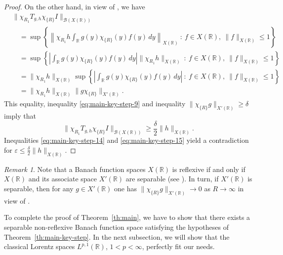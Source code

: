 \documentclass[reqno]{amsproc}
\newcommand{\cB}{\mathcal{B}}
\newcommand{\eps}{\varepsilon}
\newcommand{\R}{\mathbb{R}}
\theoremstyle{definition}
\theoremstyle{remark}
\newtheorem{remark}[theorem]{Remark}
\numberwithin{equation}{section}
\begin{document}
\begin{proof}
On the other hand, in view of \cite[Chap.~1, Lemma~2.8]{BS88},
we have
\begin{align*}
&
\|\chi_{R_1} T_{g,h}\chi_{\{R\}}I\|_{\cB(X(\R))}
\\
&\quad=
\sup\left\{
\left\|\chi_{R_1}h\int_\R g(y)\chi_{\{R\}}(y)f(y)\,dy\right\|_{X(\R)}
\ :\
f\in X(\R),\ \|f\|_{X(\R)}\le 1
\right\}
\\
&\quad=
\sup\left\{
\left|\int_\R g(y)\chi_{\{R\}}(y)f(y)\,dy\right|
\|\chi_{R_1}h\|_{X(\R)}
\ :\
f\in X(\R),\ \|f\|_{X(\R)}\le 1
\right\}
\\
&\quad=\|\chi_{R_1}h\|_{X(\R)}
\sup\left\{
\left|\int_\R g(y)\chi_{\{R\}}(y)f(y)\,dy\right|
\ :\
f\in X(\R),\ \|f\|_{X(\R)}\le 1
\right\}
\\
&\quad=
\|\chi_{R_1}h\|_{X(\R)}\|g\chi_{\{R\}}\|_{X'(\R)}.
\end{align*}
This equality, inequality \eqref{eq:main-key-step-9} and inequality
$\|\chi_{\{R\}}g\|_{X'(\R)}\ge\delta$ imply that
\begin{equation}\label{eq:main-key-step-15}
\|\chi_{R_1}T_{g,h}\chi_{\{R\}}I\|_{\cB(X(\R))}
\ge\frac{\delta}{2}\|h\|_{X(\R)}.
\end{equation}
Inequalities \eqref{eq:main-key-step-14} and \eqref{eq:main-key-step-15}
yield a contradiction for $\eps\le\frac{\delta}{2}\|h\|_{X(\R)}$.
\end{proof}
\begin{remark}
Note that a Banach function spaces $X(\R)$ is reflexive if and only if
$X(\R)$ and its associate space $X'(\R)$ are separable (see 
\cite[Chap.~1, Corollaries~4.4 and 5.6]{BS88}). In turn, if $X'(\R)$ is 
separable, then for any $g\in X'(\R)$ one has 
$\|\chi_{\{R\}}g\|_{X'(\R)}\to 0$ as $R\to\infty$ in view of 
\cite[Chap.~1, Definition~3.1 and Corollary~5.6]{BS88}.
\end{remark}
To complete the proof of Theorem~\ref{th:main}, we have to show that
there exists a separable non-reflexive Banach function space satisfying the
hypotheses of Theorem~\ref{th:main-key-step}. In the next subsection, we will
show that the classical Lorentz spaces $L^{p,1}(\R)$, $1<p<\infty$,
perfectly fit our needs. 
\end{document}
